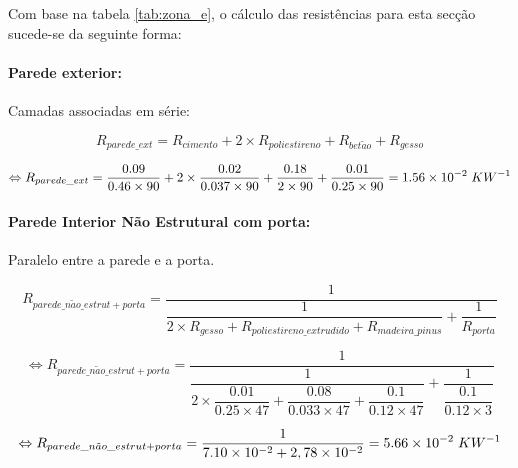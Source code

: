 \documentclass[12pt, a4paper]{article}
\begin{document}
Com base na tabela \ref*{tab:zona_e}, o cálculo das resistências para esta secção sucede-se da seguinte forma:

\paragraph{Parede exterior:}\label{par:zona_e_ext}Camadas associadas em série:

\begin{equation}
	R_{parede\_ext} = R_{cimento} + 2 \times R_{poliestireno} + R_{bet\tilde{a}o} + R_{gesso}
	\label{eq:zona_e_ext_1}
\end{equation}

\begin{equation}
	\Leftrightarrow R_{parede\_ext} =
	\dfrac{0.09}{0.46 \times 90} +
	2 \times \dfrac{0.02}{0.037 \times 90} +
	\dfrac{0.18}{2 \times 90} +
	\dfrac{0.01}{0.25 \times 90} = 1.56 \times 10^{-2} \hspace{1mm} KW^{-1}
	\label{eq:zona_e_ext_2}
\end{equation}

\paragraph{Parede Interior N\~ao Estrutural com porta:}\label{par:zona_e_int_n_est}Paralelo entre a parede e a porta. 

\begin{equation}
    R_{parede\_n\tilde{a}o\_estrut + porta} =
        \dfrac{1}{
			\dfrac{1}{
            2 \times R_{gesso} + R_{poliestireno\_extrudido} + R_{madeira\_pinus}
			}  
			+
			\dfrac{1}{
				R_{porta}
			}  
		}
    \label{eq:zona_e_int_n_est_1}
\end{equation}

\begin{equation}
    \Leftrightarrow R_{parede\_n\tilde{a}o\_estrut + porta} =
        \dfrac{1}{
			\dfrac{1}{
            2 \times \dfrac{0.01}{0.25 \times 47} +
            \dfrac{0.08}{0.033 \times 47} +
            \dfrac{0.1}{0.12 \times 47}
        	}
			+
			\dfrac{1}{
            \dfrac{0.1}{0.12 \times 3}
			}
		}
    \label{eq:zona_e_int_n_est_2}
\end{equation}

\begin{equation}
    \Leftrightarrow R_{parede\_n\tilde{a}o\_estrut + porta} =
	\dfrac{1}{
        7.10 \times 10^{-2} + 2,78 \times 10^{-2}
	}
	= 5.66 \times 10^{-2} \hspace{1mm} KW^{-1}
    \label{eq:zona_e_int_n_est_3}
\end{equation}
\end{document}
